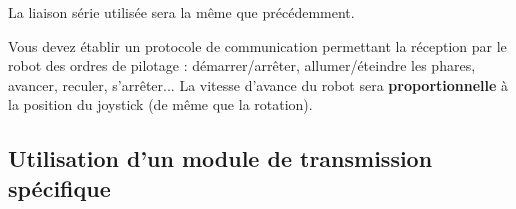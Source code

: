 \documentclass[10pt]{article} %
\begin{document}
La liaison série utilisée sera la même que précédemment.

Vous devez établir un protocole de communication permettant la réception par le robot des ordres de pilotage : démarrer/arrêter, allumer/éteindre les phares, avancer, reculer, s'arrêter... La vitesse d'avance du robot sera \textbf{proportionnelle} à la position du joystick (de même que la rotation).


\subsection*{Utilisation d'un module de transmission spécifique}
\end{document}
